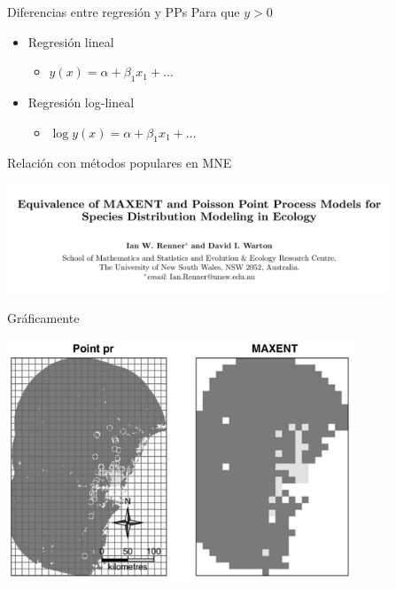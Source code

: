 \documentclass[
  11pt,
  ignorenonframetext,
]{beamer}
\providecommand{\tightlist}{%
  \setlength{\itemsep}{0pt}\setlength{\parskip}{0pt}}
\begin{document}
\begin{frame}{Diferencias entre regresión y PPs}
\protect\hypertarget{diferencias-entre-regresiuxf3n-y-pps-1}{}
Para que \(y >0\)

\begin{itemize}
\item
  Regresión lineal

  \begin{itemize}
  \tightlist
  \item
    \(y(x) = \alpha + \beta_1 x_1 + \dots\)
  \end{itemize}
\item
  Regresión log-lineal

  \begin{itemize}
  \tightlist
  \item
    \(\log y(x) = \alpha + \beta_1 x_1 + \dots\)
  \end{itemize}
\end{itemize}
\end{frame}

\begin{frame}{Relación con métodos populares en MNE}
\protect\hypertarget{relaciuxf3n-con-muxe9todos-populares-en-mne}{}
\begin{center}\includegraphics[width=4.49in]{Figuras/Equivalencia-maxent} \end{center}
\end{frame}

\begin{frame}{Gráficamente}
\protect\hypertarget{gruxe1ficamente}{}
\begin{center}\includegraphics[width=4.09in]{Figuras/Maxent-PPMs} \end{center}
\end{frame}
\end{document}
